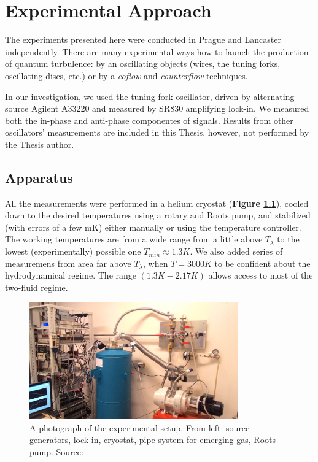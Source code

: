 \chapter{Experimental Approach}

The experiments presented here were conducted in Prague and Lancaster independently. There are many experimental ways how to launch the production of quantum turbulence: by an oscillating objects (wires, the tuning forks, oscillating discs, etc.) or by a \textit{coflow} and \textit{counterflow} techniques.

In our investigation, we used the tuning fork oscillator, driven by alternating source Agilent A33220 and measured by SR830 amplifying lock-in. We measured both the in-phase and anti-phase componentes of signals. Results from other oscillators' measurements are included in this Thesis, however, not performed by the Thesis author.

\section{Apparatus}

All the measurements were performed in a helium cryostat (\textbf{Figure \ref{cryostat}}), cooled down to the desired temperatures using a rotary and Roots pump, and stabilized (with errors of a few mK) either manually or using the temperature controller. The working temperatures are from a wide range from a little above $T_{\lambda}$ to the lowest (experimentally) possible one $T_{min} \approx 1.3\unit{K}$. We also added series of measuremens from area far above $T_{\lambda}$, when $T = 3000\unit{K}$ to be confident about the hydrodynamical regime. The range $(1.3\unit{K} - 2.17\unit{K})$ allows access to most of the two-fluid regime.

\begin{figure}[h]
	\centering
	\includegraphics[width=0.8\textwidth]{graphics/exp/apparatus}
	\caption{A photograph of the experimental setup. From left: source generators, lock-in, cryostat, pipe system for emerging gas, Roots pump. Source: \cite{bakalaris}}
	\label{cryostat}
\end{figure}

